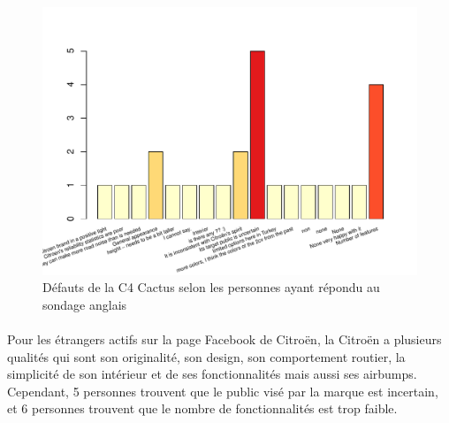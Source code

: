 \documentclass[12pt]{article}\usepackage[]{graphicx}\usepackage[]{color}
\makeatletter
\def\maxwidth{ %
  \ifdim\Gin@nat@width>\linewidth
    \linewidth
  \else
    \Gin@nat@width
  \fi
}
\newenvironment{knitrout}{}{} %
\makeatother
\begin{document}
\begin{knitrout}
\color{fgcolor}\begin{figure}[H]
\includegraphics[width=\maxwidth]{figure/flaws_en-1} \caption[Défauts de la C4 Cactus selon les personnes ayant répondu au sondage anglais]{Défauts de la C4 Cactus selon les personnes ayant répondu au sondage anglais}\label{fig:flaws en}
\end{figure}


\end{knitrout}

\paragraph{} Pour les étrangers actifs sur la page Facebook de Citroën, la
Citroën a plusieurs qualités qui sont son originalité, son design, son
comportement routier, la simplicité de son intérieur et de ses fonctionnalités
mais aussi ses airbumps. Cependant, 5 personnes trouvent que le public visé par
la marque est incertain, et 6 personnes trouvent que le nombre de
fonctionnalités est trop faible.
\end{document}

